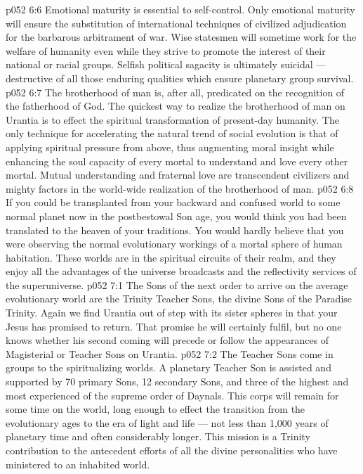 \vs p052 6:6 \bibnobreakspace {} Emotional maturity is essential to self\hyp{}control. Only emotional maturity will ensure the substitution of international techniques of civilized adjudication for the barbarous arbitrament of war. Wise statesmen will sometime work for the welfare of humanity even while they strive to promote the interest of their national or racial groups. Selfish political sagacity is ultimately suicidal --- destructive of all those enduring qualities which ensure planetary group survival.
\vs p052 6:7 \bibnobreakspace {} The brotherhood of man is, after all, predicated on the recognition of the fatherhood of God. The quickest way to realize the brotherhood of man on Urantia is to effect the spiritual transformation of present\hyp{}day humanity. The only technique for accelerating the natural trend of social evolution is that of applying spiritual pressure from above, thus augmenting moral insight while enhancing the soul capacity of every mortal to understand and love every other mortal. Mutual understanding and fraternal love are transcendent civilizers and mighty factors in the world\hyp{}wide realization of the brotherhood of man.
\vs p052 6:8 \pc If you could be transplanted from your backward and confused world to some normal planet now in the postbestowal Son age, you would think you had been translated to the heaven of your traditions. You would hardly believe that you were observing the normal evolutionary workings of a mortal sphere of human habitation. These worlds are in the spiritual circuits of their realm, and they enjoy all the advantages of the universe broadcasts and the reflectivity services of the superuniverse.
\vs p052 7:1 The Sons of the next order to arrive on the average evolutionary world are the Trinity Teacher Sons, the divine Sons of the Paradise Trinity. Again we find Urantia out of step with its sister spheres in that your Jesus has promised to return. That promise he will certainly fulfil, but no one knows whether his second coming will precede or follow the appearances of Magisterial or Teacher Sons on Urantia.
\vs p052 7:2 The Teacher Sons come in groups to the spiritualizing worlds. A planetary Teacher Son is assisted and supported by 70 primary Sons, 12 secondary Sons, and three of the highest and most experienced of the supreme order of Daynals. This corps will remain for some time on the world, long enough to effect the transition from the evolutionary ages to the era of light and life --- not less than 1,000 years of planetary time and often considerably longer. This mission is a Trinity contribution to the antecedent efforts of all the divine personalities who have ministered to an inhabited world.
